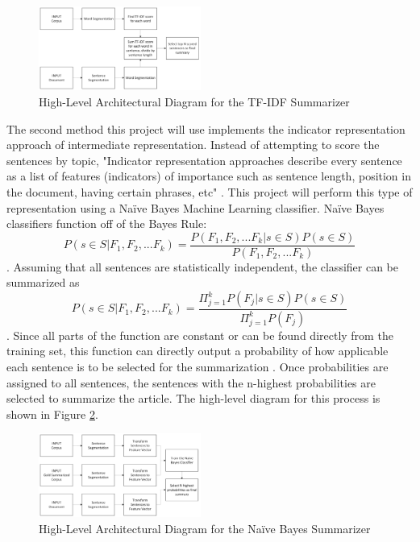 \documentclass{IEEEtran}
\begin{document}
\begin{figure}[h]
\centering
\includegraphics[width=0.475\textwidth]{images/TF-IDF_Diagram.png}
\caption{High-Level Architectural Diagram for the TF-IDF Summarizer}
\label{fig:tfidf_diagram}
\end{figure}

The second method this project will use implements the indicator representation approach of intermediate representation. Instead of attempting to score the sentences by topic, "Indicator representation approaches describe every sentence as a list of features (indicators) of importance such as sentence length, position in the document, having certain phrases, etc" \cite{related_summarization}. This project will perform this type of representation using a Na\"{i}ve Bayes Machine Learning classifier. Na\"{i}ve Bayes classifiers function off of the Bayes Rule:
\[P(s \in S | F_1, F_2, ...F_k) = \frac{P(F_1, F_2, ...F_k | s \in S)P(s \in S)}{P(F_1, F_2, ...F_k)}\]
\cite{related_naive_bayes_summarizer}. Assuming that all sentences are statistically independent, the classifier can be summarized as
\[P(s \in S | F_1, F_2, ...F_k) = \frac{\Pi_{j=1}^k P(F_j | s \in S)P(s \in S)}{\Pi_{j=1}^k P(F_j)}\]
\cite{related_naive_bayes_summarizer}. Since all parts of the function are constant or can be found directly from the training set, this function can directly output a probability of how applicable each sentence is to be selected for the summarization \cite{related_naive_bayes_summarizer}. Once probabilities are assigned to all sentences, the sentences with the n-highest probabilities are selected to summarize the article. The high-level diagram for this process is shown in Figure \ref{fig:naive_bayes_diagram}.

\begin{figure}[h]
\centering
\includegraphics[width=0.475\textwidth]{images/NaiveBayes_Diagram.png}
\caption{High-Level Architectural Diagram for the Na\"{i}ve Bayes Summarizer}
\label{fig:naive_bayes_diagram}
\end{figure}
\end{document}
